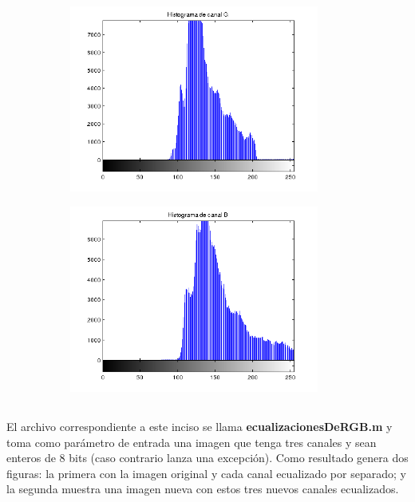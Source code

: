 \documentclass{article}
\begin{document}
\begin{figure}[H]
    \begin{subfigure}{0.5\textwidth}
        \includegraphics[width=0.9\textwidth]{histogramaG-1923.png}
    \end{subfigure}\hfill
    \begin{subfigure}{0.5\textwidth}
        \includegraphics[width=0.9\textwidth]{histogramaB-1923.png}
    \end{subfigure}
\end{figure}

\subsection{}

El archivo correspondiente a este inciso se llama \textbf{ecualizacionesDeRGB.m} y toma como parámetro de entrada una imagen que tenga tres canales y sean enteros de 8 bits (caso contrario lanza una excepción). Como resultado genera dos figuras: la primera con la imagen original y cada canal ecualizado por separado; y la segunda muestra una imagen nueva con estos tres nuevos canales ecualizados. 
\end{document}
